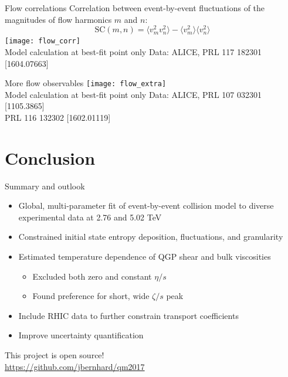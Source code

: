 \documentclass{beamer}
\begin{document}
\begin{frame}{Flow correlations}
  Correlation between event-by-event fluctuations of the magnitudes of flow harmonics $m$ and $n$:
  \begin{equation*}
    \text{SC}(m, n) = \langle v_m^2 v_n^2 \rangle  - \langle v_m^2 \rangle \langle v_n^2 \rangle
  \end{equation*}
  \texttt{[image: flow\_corr]} \\[1em]
  \tiny *Model calculation at best-fit point only \hfill
  Data: ALICE, PRL 117 182301 [1604.07663]
\end{frame}


\begin{frame}{More flow observables}
  \vspace{2em}
  \texttt{[image: flow\_extra]} \\[1em]
  \tiny *Model calculation at best-fit point only \hfill
  Data: ALICE, PRL 107 032301 [1105.3865] \\
  \hfill PRL 116 132302 [1602.01119]
\end{frame}


\section{Conclusion}

\begin{frame}{Summary and outlook}
  \vspace{1em}
  \begin{itemize}
    \item Global, multi-parameter fit of event-by-event collision model to diverse experimental data at 2.76 and 5.02 TeV
    \item Constrained initial state entropy deposition, fluctuations, and granularity
    \item Estimated temperature dependence of QGP shear and bulk viscosities
      \begin{itemize}
        \item Excluded both zero and constant $\eta/s$
        \item Found preference for short, wide $\zeta/s$ peak
      \end{itemize}
  \end{itemize}
  \begin{itemize}
    \item Include RHIC data to further constrain transport coefficients
    \item Improve uncertainty quantification
  \end{itemize}
  \begin{center}
    This project is open source! \\
    \url{https://github.com/jbernhard/qm2017}
  \end{center}
\end{frame}
\end{document}
